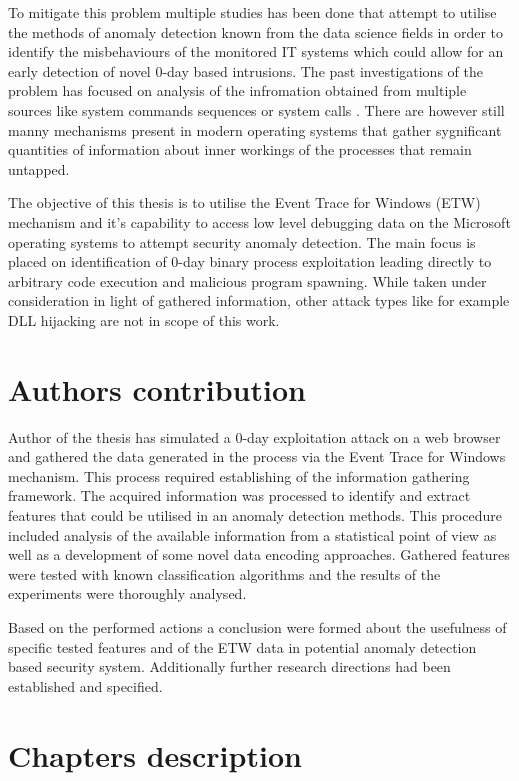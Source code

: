 \documentclass[a4paper,twoside,12pt]{book}
\begin{document}
To mitigate this problem multiple studies has been done that attempt to utilise the methods of
anomaly detection known from the data science fields in order to identify the misbehaviours of 
the monitored IT systems which could allow for an early detection of novel 0-day based intrusions.
The past investigations of the problem has focused on analysis of the infromation obtained from 
multiple sources like system commands sequences \cite{bib:lane1997application} or system calls 
\cite{bib:rsvm}. There are however still manny mechanisms present in modern operating systems 
that gather sygnificant quantities of information about inner workings of the processes that remain
untapped. 

The objective of this thesis is to utilise the Event Trace for Windows (ETW) mechanism and it's 
capability to access low level debugging data on the Microsoft operating systems to attempt
security anomaly detection. The main focus is placed on identification of 0-day binary process 
exploitation leading directly to arbitrary code execution and malicious program spawning. While 
taken under consideration in light of gathered information, other attack types like for example 
DLL hijacking are not in scope of this work.

\section{Authors contribution}

Author of the thesis has simulated a 0-day exploitation attack on a web browser and gathered 
the data generated in the process via the Event Trace for Windows mechanism. This process 
required establishing of the information gathering framework. The acquired 
information was processed to identify and extract features that could be utilised in an anomaly detection
methods. This procedure included analysis of the available information from a statistical point of view
as well as a development of some novel data encoding approaches. Gathered 
features were tested with known classification algorithms and the results of the experiments were thoroughly analysed.

Based on the performed actions a conclusion were formed about the usefulness of specific tested features 
and of the ETW data
in potential anomaly detection based security system. Additionally further research directions
had been established and specified.

\section{Chapters description}
\end{document}
